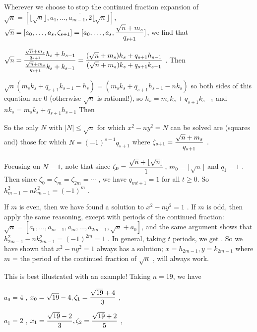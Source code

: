 \ssk


Wherever we choose to stop the continued fraction expansion of 
$\sqrt{n} = [\lfloor\sqrt{n}\rfloor,\overline{a_1,\ldots,a_{m-1},2\lfloor\sqrt{n}\rfloor}]$, 
$\displaystyle \sqrt{n} = [a_0,\ldots,a_s,\zeta_{s+1}] = [a_0,\ldots,a_s,{{\sqrt{n}+m_s}\over{q_{s+1}}}]$, we find that 

$\displaystyle \sqrt{n} = 
{{{{\sqrt{n}+m_s}\over{q_{s+1}}}h_s+h_{s-1}}\over{{{\sqrt{n}+m_s}\over{q_{s+1}}}k_s+k_{s-1}}}
= {{(\sqrt{n}+m_s)h_s+q_{s+1} h_{s-1}}\over{(\sqrt{n}+m_s)k_s+q_{s+1}k_{s-1}}}$ . Then

$\sqrt{n}(m_sk_s+q_{s+1}k_{s-1} - h_s) = (m_sk_s + q_{s+1} h_{s-1} - nk_s)$ so both sides 
of this equation are $0$ (otherwise $\sqrt{n}$ is rational!), so
$h_s=m_sk_s+q_{s+1}k_{s-1}$ and $nk_s=m_sk_s + q_{s+1} h_{s-1}$ Then

\ssk


\ssk

So the only $N$ with $|N|\leq \sqrt{n}$ for which $x^2-ny^2=N$
can be solved are (squares and) those for which $N = (-1)^{s-1}q_{s+1}$ where 
$\displaystyle \zeta_{s+1} = {{\sqrt{n}+m_{s}}\over{q_{s+1}}}$ . 

Focusing on $N=1$, note that since $\displaystyle \zeta_0={{\sqrt{n}+\lfloor\sqrt{n}\rfloor}\over{1}}$, 
$m_0=\lfloor\sqrt{n}\rfloor$
and $q_1=1$ . Then since $\zeta_0=\zeta_m=\zeta_{2m} = \cdots$ , we have
$q_{mt+1} = 1$ for all $t\geq 0$. 
So $h_{m-1}^2-nk_{m-1}^2 = (-1)^m$ . 

If $m$ is even, then we have found a solution to
$x^2-ny^2=1$ . If $m$ is odd, then apply the same reasoning, except with 
periods of the continued fraction: 
$\sqrt{n} = [a_0,\ldots,a_{m-1},a_m,\ldots,a_{2m-1},\sqrt{n}+a_0]$, and the same argument shows
that $h_{2m-1}^2-nk_{2m-1}^2 = (-1)^{2m} = 1$ . In general, taking $t$ periods, we get
 . So we have shown that $x^2-ny^2=1$ always has a solution;
$x=h_{2m-1}, y=k_{2m-1}$ where $m$ = the period of the continued fraction of $\sqrt{n}$ , will
always work.

\msk

This is best illustrated with an example! Taking $n=19$, we have

$a_0=4$ , $\displaystyle x_0=\sqrt{19}-4, \zeta_1 = {{\sqrt{19}+4}\over{3}}$ , 

\hskp $a_1=2$ , $\displaystyle x_1={{\sqrt{19}-2}\over{3}}, \zeta_2 = {{\sqrt{19}+2}\over{5}}$ , 

